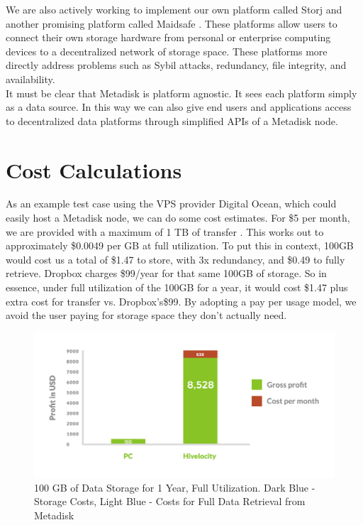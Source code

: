 \documentclass[a4paper,10pt]{article}
\begin{document}
We are also actively working to implement our own platform called Storj \cite{7} and another promising platform called Maidsafe \cite{1}. These platforms allow users to connect their own storage hardware from personal or enterprise computing devices to a decentralized network of storage space. These platforms more directly address problems such as Sybil attacks, redundancy, file integrity, and availability.  \\

It must be clear that Metadisk is platform agnostic. It sees each platform simply as a data source. In this way we can also give end users and applications access to decentralized data platforms through simplified APIs of a Metadisk node. 

\section*{Cost Calculations}

As an example test case using the VPS provider Digital Ocean, which could easily host a Metadisk node, we can do some cost estimates. For \$5 per month, we are provided with a maximum of 1 TB of transfer \cite{8}. This works out to approximately \$0.0049 per GB at full utilization. To put this in context, 100GB would cost us a total of \$1.47 to store, with 3x redundancy, and \$0.49 to fully retrieve.  Dropbox charges \$99/year for that same 100GB of storage. So in essence, under full utilization of the 100GB for a year, it would cost \$1.47 plus extra cost for transfer vs. Dropbox’s\$99.  By adopting a pay per usage model, we avoid the user  paying for storage space they don’t actually need.\\

\begin{figure}[h!]
  \centering
      \includegraphics[width=\linewidth]{05}
  \caption{100 GB of Data Storage for 1 Year, Full Utilization. Dark Blue - Storage Costs, Light Blue - Costs for Full Data Retrieval from Metadisk}
\end{figure}
\end{document}
